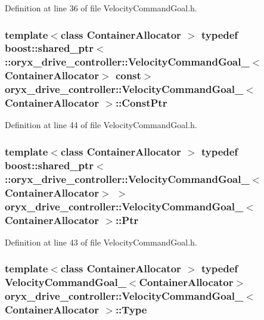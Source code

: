 \-Definition at line 36 of file \-Velocity\-Command\-Goal.\-h.

\subsubsection[{\-Const\-Ptr}]{\setlength{\rightskip}{0pt plus 5cm}template$<$class Container\-Allocator $>$ typedef boost\-::shared\-\_\-ptr$<$ \-::{\bf oryx\-\_\-drive\-\_\-controller\-::\-Velocity\-Command\-Goal\-\_\-}$<$\-Container\-Allocator$>$ const$>$ {\bf oryx\-\_\-drive\-\_\-controller\-::\-Velocity\-Command\-Goal\-\_\-}$<$ \-Container\-Allocator $>$\-::{\bf \-Const\-Ptr}}\label{structoryx__drive__controller_1_1VelocityCommandGoal___aa94fd267b2c0eadfdccac1cd6d1e3a58}


\-Definition at line 44 of file \-Velocity\-Command\-Goal.\-h.

\subsubsection[{\-Ptr}]{\setlength{\rightskip}{0pt plus 5cm}template$<$class Container\-Allocator $>$ typedef boost\-::shared\-\_\-ptr$<$ \-::{\bf oryx\-\_\-drive\-\_\-controller\-::\-Velocity\-Command\-Goal\-\_\-}$<$\-Container\-Allocator$>$ $>$ {\bf oryx\-\_\-drive\-\_\-controller\-::\-Velocity\-Command\-Goal\-\_\-}$<$ \-Container\-Allocator $>$\-::{\bf \-Ptr}}\label{structoryx__drive__controller_1_1VelocityCommandGoal___a15b77e1f8da5a4b100b378f64b59cd48}


\-Definition at line 43 of file \-Velocity\-Command\-Goal.\-h.

\subsubsection[{\-Type}]{\setlength{\rightskip}{0pt plus 5cm}template$<$class Container\-Allocator $>$ typedef {\bf \-Velocity\-Command\-Goal\-\_\-}$<$\-Container\-Allocator$>$ {\bf oryx\-\_\-drive\-\_\-controller\-::\-Velocity\-Command\-Goal\-\_\-}$<$ \-Container\-Allocator $>$\-::{\bf \-Type}}\label{structoryx__drive__controller_1_1VelocityCommandGoal___a374f1f743d9a65cf0bc6f297665a492f}


